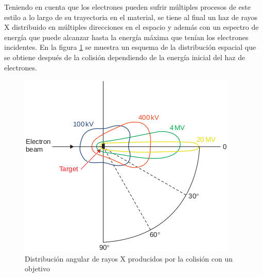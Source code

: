 Teniendo en cuenta que los electrones pueden sufrir múltiples procesos de este estilo a lo largo de su trayectoria en el material, se tiene al final un haz de rayos X distribuido en múltiples direcciones en el espacio y además con un espectro de energía que puede alcanzar hasta la energía máxima que tenían los electrones incidentes. En la figura \ref{fig:distribucionAngular} se muestra un esquema de la distribución espacial que se obtiene después de la colisión dependiendo de la energía inicial del haz de electrones. \\

\begin{figure}[H]
	\centering
	\includegraphics[width=0.7\linewidth]{images/distribucionAngular.png}
	\caption{Distribución angular de rayos X producidos por la colisión con un objetivo\cite{khan2014the}}
	\label{fig:distribucionAngular}
\end{figure}

